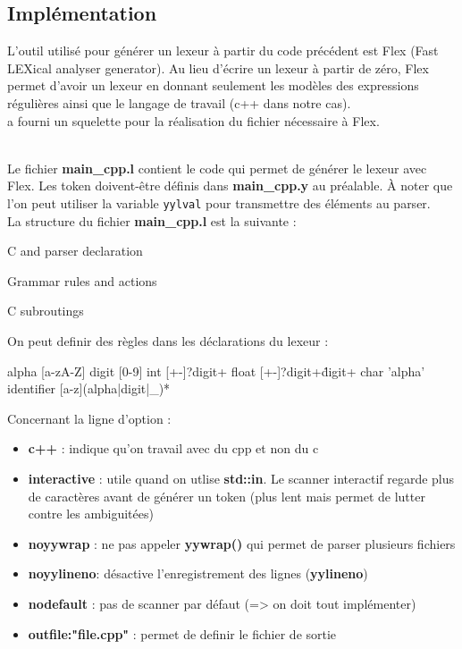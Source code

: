 \documentclass[a4paper]{article}%
\begin{document}
\subsection{Implémentation}%

L'outil utilisé pour générer un lexeur à partir du code précédent est Flex (Fast
LEXical analyser generator). Au lieu d'écrire un lexeur à partir de zéro, Flex
permet d'avoir un lexeur en donnant seulement les modèles des expressions
régulières ainsi que le langage de travail (c++ dans notre cas).\\

\cite{compilerFlexBison} a fourni un squelette pour la réalisation du fichier
nécessaire à Flex.\\~\\

\noindent

Le fichier \textbf{main\_cpp.l} contient le code qui permet de générer le lexeur
avec Flex. Les token doivent-être définis dans \textbf{main\_cpp.y} au
préalable.
À noter que l'on peut utiliser la variable \lstinline{yylval} pour transmettre
des éléments au parser.\\

La structure du fichier \textbf{main\_cpp.l} est la suivante :

\begin{code}
C and parser declaration

Grammar rules and actions

C subroutings
\end{code}\leavevmode\newline


\noindent
On peut definir des règles dans les déclarations du lexeur :

\begin{code}

alpha [a-zA-Z]
digit [0-9]
int [+-]?{digit}+
float [+-]?{digit}+\.{digit}+
char '{alpha}'
identifier [a-z]({alpha}|{digit}|_)*
\end{code}\leavevmode\newline

\noindent
Concernant la ligne d'option :
\begin{itemize}
\item \textbf{c++} : indique qu'on travail avec du cpp et non du c
\item \textbf{interactive} : utile quand on utlise \textbf{std::in}. Le scanner interactif regarde plus de caractères avant de générer un token (plus lent mais permet de lutter contre les ambiguitées)
\item \textbf{noyywrap} : ne pas appeler \textbf{yywrap()} qui permet de parser plusieurs fichiers
\item \textbf{noyylineno}: désactive l'enregistrement des lignes (\textbf{yylineno})
\item \textbf{nodefault} : pas de scanner par défaut (=> on doit tout implémenter)
\item \textbf{outfile:"file.cpp"} : permet de definir le fichier de sortie
\end{itemize}\leavevmode\\[3\baselineskip]
\end{document}
